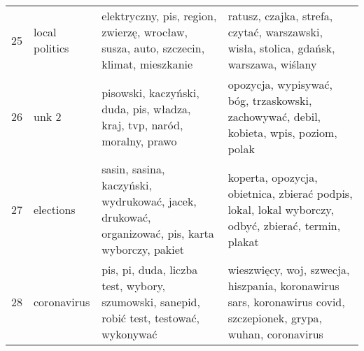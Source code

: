 \begin{tabular}{p{2cm}p{2cm}p{5cm}p{5cm}}
          25 &           local politics &                            elektryczny, pis, region, zwierzę, wrocław, susza, auto, szczecin, klimat, mieszkanie &                                   ratusz, czajka, strefa, czytać, warszawski, wisła, stolica, gdańsk, warszawa, wiślany \\
          26 &                    unk 2 &                                         pisowski, kaczyński, duda, pis, władza, kraj, tvp, naród, moralny, prawo &                                  opozycja, wypisywać, bóg, trzaskowski, zachowywać, debil, kobieta, wpis, poziom, polak \\
          27 &                elections &                  sasin, sasina, kaczyński, wydrukować, jacek, drukować, organizować, pis, karta wyborczy, pakiet &                     koperta, opozycja, obietnica, zbierać podpis, lokal, lokal wyborczy, odbyć, zbierać, termin, plakat \\
          28 &              coronavirus &                          pis, pi, duda, liczba test, wybory, szumowski, sanepid, robić test, testować, wykonywać &        wieszwięcy, woj, szwecja, hiszpania, koronawirus sars, koronawirus covid, szczepionek, grypa, wuhan, coronavirus \\
\bottomrule
\end{tabular}
